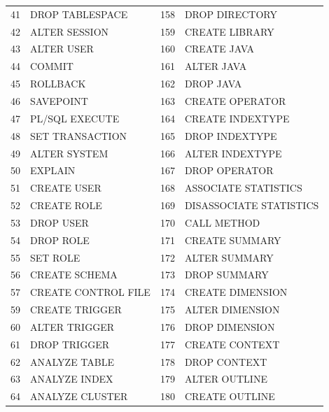 \begin{appendix}
\begin{longtable}[]{@{}rl|rl@{}}
41   & DROP TABLESPACE              & 158 & DROP DIRECTORY               \\
42   & ALTER SESSION                & 159 & CREATE LIBRARY               \\
43   & ALTER USER                   & 160 & CREATE JAVA                  \\
44   & COMMIT                       & 161 & ALTER JAVA                   \\
45   & ROLLBACK                     & 162 & DROP JAVA                    \\
46   & SAVEPOINT                    & 163 & CREATE OPERATOR              \\
47   & PL/SQL EXECUTE               & 164 & CREATE INDEXTYPE             \\
48   & SET TRANSACTION              & 165 & DROP INDEXTYPE               \\
49   & ALTER SYSTEM                 & 166 & ALTER INDEXTYPE              \\
50   & EXPLAIN                      & 167 & DROP OPERATOR                \\
51   & CREATE USER                  & 168 & ASSOCIATE STATISTICS         \\
52   & CREATE ROLE                  & 169 & DISASSOCIATE STATISTICS      \\
53   & DROP USER                    & 170 & CALL METHOD                  \\
54   & DROP ROLE                    & 171 & CREATE SUMMARY               \\
55   & SET ROLE                     & 172 & ALTER SUMMARY                \\
56   & CREATE SCHEMA                & 173 & DROP SUMMARY                 \\
57   & CREATE CONTROL FILE          & 174 & CREATE DIMENSION             \\
59   & CREATE TRIGGER               & 175 & ALTER DIMENSION              \\
60   & ALTER TRIGGER                & 176 & DROP DIMENSION               \\
61   & DROP TRIGGER                 & 177 & CREATE CONTEXT               \\
62   & ANALYZE TABLE                & 178 & DROP CONTEXT                 \\
63   & ANALYZE INDEX                & 179 & ALTER OUTLINE                \\
64   & ANALYZE CLUSTER              & 180 & CREATE OUTLINE               \\

\end{longtable}
\end{appendix}
